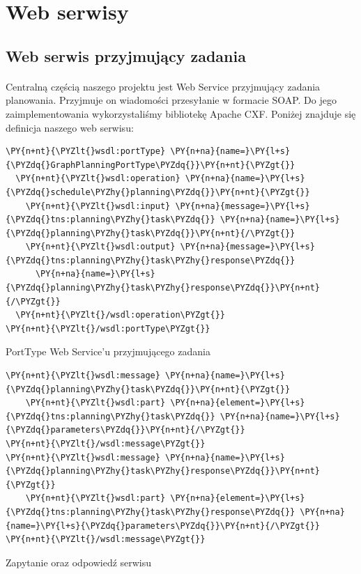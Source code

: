 \section{Web serwisy}
\label{sec:webservices}

\subsection{Web serwis przyjmujący zadania}
\paragraph{}
Centralną częścią naszego projektu jest Web Service przyjmujący zadania planowania. 
Przyjmuje on wiadomości przesyłanie w formacie SOAP. 
Do jego zaimplementowania wykorzystaliśmy bibliotekę Apache CXF.
Poniżej znajduje się definicja naszego web serwisu:

\begin{program}
\begin{code}
\begin{Verbatim}[commandchars=\\\{\}]
\PY{n+nt}{\PYZlt{}wsdl:portType} \PY{n+na}{name=}\PY{l+s}{\PYZdq{}GraphPlanningPortType\PYZdq{}}\PY{n+nt}{\PYZgt{}}
  \PY{n+nt}{\PYZlt{}wsdl:operation} \PY{n+na}{name=}\PY{l+s}{\PYZdq{}schedule\PYZhy{}planning\PYZdq{}}\PY{n+nt}{\PYZgt{}}
    \PY{n+nt}{\PYZlt{}wsdl:input} \PY{n+na}{message=}\PY{l+s}{\PYZdq{}tns:planning\PYZhy{}task\PYZdq{}} \PY{n+na}{name=}\PY{l+s}{\PYZdq{}planning\PYZhy{}task\PYZdq{}}\PY{n+nt}{/\PYZgt{}}
    \PY{n+nt}{\PYZlt{}wsdl:output} \PY{n+na}{message=}\PY{l+s}{\PYZdq{}tns:planning\PYZhy{}task\PYZhy{}response\PYZdq{}} 
      \PY{n+na}{name=}\PY{l+s}{\PYZdq{}planning\PYZhy{}task\PYZhy{}response\PYZdq{}}\PY{n+nt}{/\PYZgt{}}
  \PY{n+nt}{\PYZlt{}/wsdl:operation\PYZgt{}}
\PY{n+nt}{\PYZlt{}/wsdl:portType\PYZgt{}}
\end{Verbatim}
\end{code}
\caption{PortType Web Service'u przyjmującego zadania}
\end{program}

\begin{program}
\begin{code}
\begin{Verbatim}[commandchars=\\\{\}]
\PY{n+nt}{\PYZlt{}wsdl:message} \PY{n+na}{name=}\PY{l+s}{\PYZdq{}planning\PYZhy{}task\PYZdq{}}\PY{n+nt}{\PYZgt{}}
    \PY{n+nt}{\PYZlt{}wsdl:part} \PY{n+na}{element=}\PY{l+s}{\PYZdq{}tns:planning\PYZhy{}task\PYZdq{}} \PY{n+na}{name=}\PY{l+s}{\PYZdq{}parameters\PYZdq{}}\PY{n+nt}{/\PYZgt{}}
\PY{n+nt}{\PYZlt{}/wsdl:message\PYZgt{}}
\PY{n+nt}{\PYZlt{}wsdl:message} \PY{n+na}{name=}\PY{l+s}{\PYZdq{}planning\PYZhy{}task\PYZhy{}response\PYZdq{}}\PY{n+nt}{\PYZgt{}}
    \PY{n+nt}{\PYZlt{}wsdl:part} \PY{n+na}{element=}\PY{l+s}{\PYZdq{}tns:planning\PYZhy{}task\PYZhy{}response\PYZdq{}} \PY{n+na}{name=}\PY{l+s}{\PYZdq{}parameters\PYZdq{}}\PY{n+nt}{/\PYZgt{}}
\PY{n+nt}{\PYZlt{}/wsdl:message\PYZgt{}}
\end{Verbatim}
\end{code}
\caption{Zapytanie oraz odpowiedź serwisu}
\end{program}

